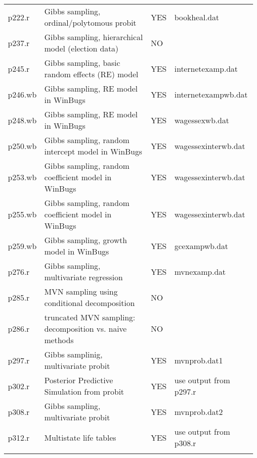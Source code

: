 \documentclass[12pt,titlepage]{article}
\begin{document}
\begin{center}
\begin{tabular}{llll}
p222.r  &Gibbs sampling, ordinal/polytomous probit     &YES   &bookheal.dat\\
p237.r  &Gibbs sampling, hierarchical model (election data)     &NO\\
p245.r  &Gibbs sampling, basic random effects (RE) model     &YES   &internetexamp.dat\\
p246.wb &Gibbs sampling, RE model in WinBugs     &YES   &internetexampwb.dat\\
p248.wb &Gibbs sampling, RE model in WinBugs     &YES   &wagessexwb.dat\\
p250.wb &Gibbs sampling, random intercept model in WinBugs     &YES  &wagessexinterwb.dat\\
p253.wb &Gibbs sampling, random coefficient model in WinBugs     &YES  &wagessexinterwb.dat\\
p255.wb &Gibbs sampling, random coefficient model in WinBugs     &YES  &wagessexinterwb.dat\\
p259.wb &Gibbs sampling, growth model in WinBugs     &YES  &gcexampwb.dat\\
p276.r  &Gibbs sampling, multivariate regression     &YES  &mvnexamp.dat\\
p285.r  &MVN sampling using conditional decomposition     &NO\\
p286.r  &truncated MVN sampling: decomposition vs. naive methods     &NO\\
p297.r  &Gibbs samplinig, multivariate probit  &YES  &mvnprob.dat1\\
p302.r  &Posterior Predictive Simulation from probit     &YES  &use output from p297.r\\
p308.r  &Gibbs sampling, multivariate probit    &YES  &mvnprob.dat2\\
p312.r  &Multistate life tables     &YES  &use output from p308.r\\ \\ \hline
\end{tabular}
\end{center}
\end{document}
